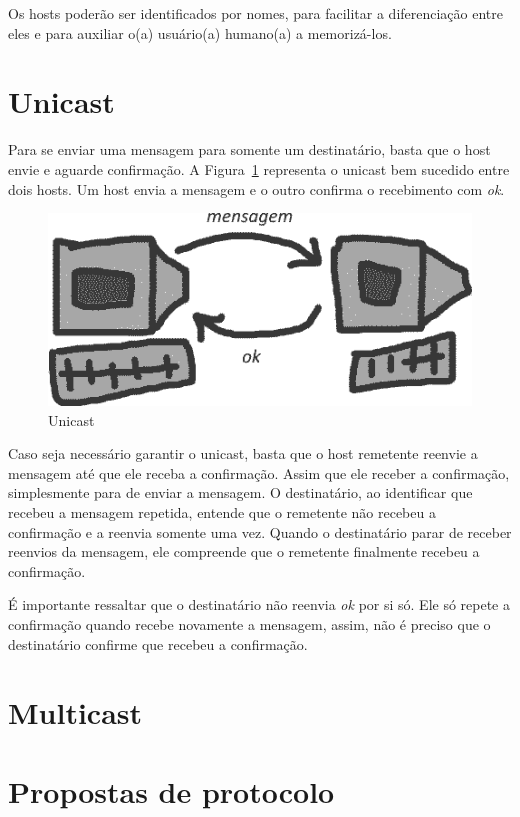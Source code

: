 \documentclass[12pt,twocolumn]{article}
\newcommand{\msg}[1]{\textsf{\textit{#1}}}
\begin{document}
				Os hosts poderão ser identificados por nomes, para facilitar a diferenciação entre eles e para auxiliar o(a) usuário(a) humano(a) a memorizá-los.							
						
		\section{Unicast}
		
			Para se enviar uma mensagem para somente um destinatário, basta que o host envie e aguarde confirmação.  
			A Figura~\ref{fig:unicast} representa o unicast bem sucedido entre dois hosts.
			Um host envia a mensagem e o outro confirma o recebimento com \msg{ok}.
			
			\begin{figure}[htp]%
				\centering
				\includegraphics[width=0.9\linewidth]{unicast.png}%
				\caption{Unicast}%
				\label{fig:unicast}				
			\end{figure}	
		
			Caso seja necessário garantir o unicast, basta que o host remetente reenvie a mensagem até que ele receba a confirmação.
			Assim que ele receber a confirmação, simplesmente para de enviar a mensagem.
			O destinatário, ao identificar que recebeu a mensagem repetida, entende que o remetente não recebeu a confirmação e a reenvia somente uma vez.
			Quando o destinatário parar de receber reenvios da mensagem, ele compreende que o remetente finalmente recebeu a confirmação.
			
			É importante ressaltar que o destinatário não reenvia \msg{ok} por si só. 
			Ele só repete a confirmação quando recebe novamente a mensagem, assim, não é preciso que o destinatário confirme que recebeu a confirmação.
		
		\section{Multicast}
		
		\section{Propostas de protocolo}	
		
			
				
			
\end{document}
